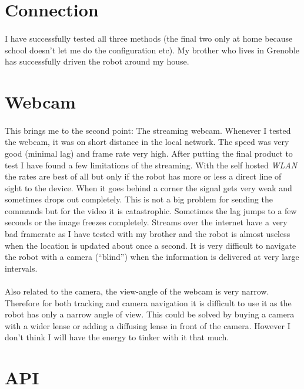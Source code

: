 \documentclass[12pt,a4paper]{report}
\begin{document}
\section{Connection}
\paragraph{}
I have successfully tested all three methods (the final two only at home because school doesn’t let me do the configuration etc). My brother who lives in Grenoble has successfully driven the robot around my house.

\section{Webcam}
\paragraph{}
This brings me to the second point: The streaming webcam. Whenever I tested the webcam, it was on short distance in the local network. The speed was very good (minimal lag) and frame rate very high. After putting the final product to test I have found a few limitations of the streaming. With the self hosted \textit{WLAN} the rates are best of all but only if the robot has more or less a direct line of sight to the device. When it goes behind a corner the signal gets very weak and sometimes drops out completely. This is not a big problem for sending the commands but for the video it is catastrophic. Sometimes the lag jumps to a few seconds or the image freezes completely. Streams over the internet have a very bad framerate as I have tested with my brother and the robot is almost useless when the location is updated about once a second. It is very difficult to navigate the robot with a camera (“blind”) when the information is delivered at very large intervals.

\paragraph{}
Also related to the camera, the view-angle of the webcam is very narrow. Therefore for both tracking and camera navigation it is difficult to use it as the robot has only a narrow angle of view. This could be solved by buying a camera with a wider lense or adding a diffusing lense in front of the camera. However I don’t think I will have the energy to tinker with it that much.

\section{API}
\end{document}
